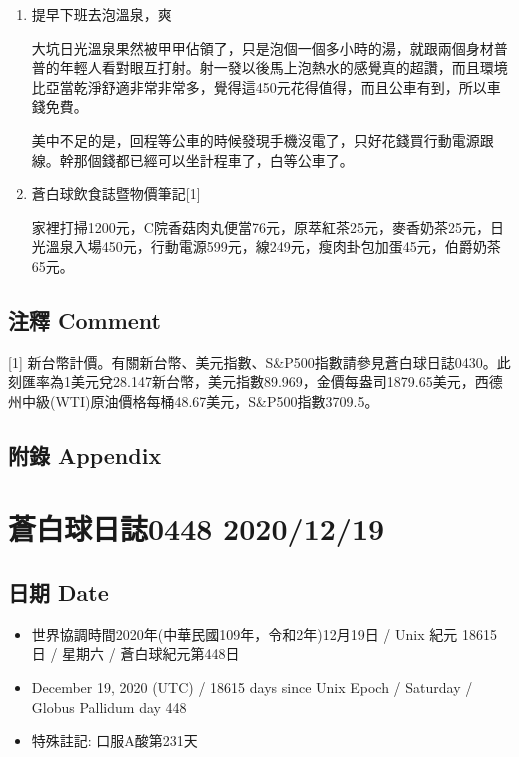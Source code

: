 \documentclass[
]{article}
\providecommand{\tightlist}{%
  \setlength{\itemsep}{0pt}\setlength{\parskip}{0pt}}
\begin{document}
\begin{enumerate}
\def\labelenumi{\arabic{enumi}.}
\item
  提早下班去泡溫泉，爽

  大坑日光溫泉果然被甲甲佔領了，只是泡個一個多小時的湯，就跟兩個身材普普的年輕人看對眼互打射。射一發以後馬上泡熱水的感覺真的超讚，而且環境比亞當乾淨舒適非常非常多，覺得這450元花得值得，而且公車有到，所以車錢免費。

  美中不足的是，回程等公車的時候發現手機沒電了，只好花錢買行動電源跟線。幹那個錢都已經可以坐計程車了，白等公車了。
\item
  蒼白球飲食誌暨物價筆記{[}1{]}

  家裡打掃1200元，C院香菇肉丸便當76元，原萃紅茶25元，麥香奶茶25元，日光溫泉入場450元，行動電源599元，線249元，瘦肉卦包加蛋45元，伯爵奶茶65元。
\end{enumerate}

\hypertarget{ux6ce8ux91cb-comment-17}{%
\subsection{注釋 Comment}\label{ux6ce8ux91cb-comment-17}}

{[}1{]}
新台幣計價。有關新台幣、美元指數、S\&P500指數請參見蒼白球日誌0430。此刻匯率為1美元兌28.147新台幣，美元指數89.969，金價每盎司1879.65美元，西德州中級(WTI)原油價格每桶48.67美元，S\&P500指數3709.5。

\hypertarget{ux9644ux9304-appendix-17}{%
\subsection{附錄 Appendix}\label{ux9644ux9304-appendix-17}}

\hypertarget{ux84bcux767dux7403ux65e5ux8a8c0448-20201219}{%
\section{蒼白球日誌0448
2020/12/19}\label{ux84bcux767dux7403ux65e5ux8a8c0448-20201219}}

\hypertarget{ux65e5ux671f-date-18}{%
\subsection{日期 Date}\label{ux65e5ux671f-date-18}}

\begin{itemize}
\tightlist
\item
  世界協調時間2020年(中華民國109年，令和2年)12月19日 / Unix 紀元 18615
  日 / 星期六 / 蒼白球紀元第448日
\item
  December 19, 2020 (UTC) / 18615 days since Unix Epoch / Saturday /
  Globus Pallidum day 448
\item
  特殊註記: 口服A酸第231天
\end{itemize}
\end{document}
